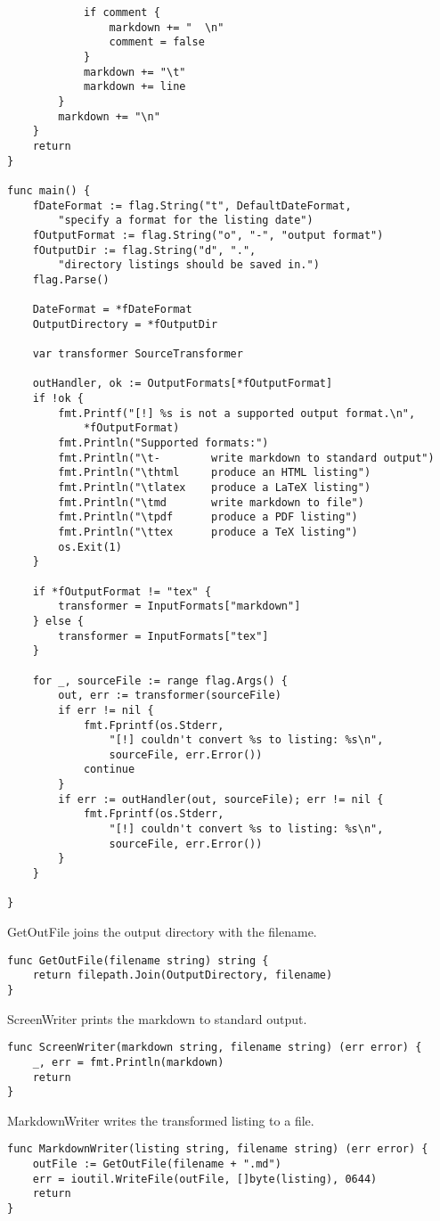 \documentclass[11pt]{article}
\begin{document}
\begin{verbatim}
			if comment {
				markdown += "  \n"
				comment = false
			}
			markdown += "\t"
			markdown += line
		}
		markdown += "\n"
	}
	return
}

func main() {
	fDateFormat := flag.String("t", DefaultDateFormat,
		"specify a format for the listing date")
	fOutputFormat := flag.String("o", "-", "output format")
	fOutputDir := flag.String("d", ".",
		"directory listings should be saved in.")
	flag.Parse()

	DateFormat = *fDateFormat
	OutputDirectory = *fOutputDir

	var transformer SourceTransformer

	outHandler, ok := OutputFormats[*fOutputFormat]
	if !ok {
		fmt.Printf("[!] %s is not a supported output format.\n",
			*fOutputFormat)
		fmt.Println("Supported formats:")
		fmt.Println("\t-        write markdown to standard output")
		fmt.Println("\thtml     produce an HTML listing")
		fmt.Println("\tlatex    produce a LaTeX listing")
		fmt.Println("\tmd       write markdown to file")
		fmt.Println("\tpdf      produce a PDF listing")
		fmt.Println("\ttex      produce a TeX listing")
		os.Exit(1)
	}

	if *fOutputFormat != "tex" {
		transformer = InputFormats["markdown"]
	} else {
		transformer = InputFormats["tex"]
	}

	for _, sourceFile := range flag.Args() {
		out, err := transformer(sourceFile)
		if err != nil {
			fmt.Fprintf(os.Stderr,
				"[!] couldn't convert %s to listing: %s\n",
				sourceFile, err.Error())
			continue
		}
		if err := outHandler(out, sourceFile); err != nil {
			fmt.Fprintf(os.Stderr,
				"[!] couldn't convert %s to listing: %s\n",
				sourceFile, err.Error())
		}
	}

}

\end{verbatim}

GetOutFile joins the output directory with the filename.


\begin{verbatim}
func GetOutFile(filename string) string {
	return filepath.Join(OutputDirectory, filename)
}

\end{verbatim}

ScreenWriter prints the markdown to standard output.


\begin{verbatim}
func ScreenWriter(markdown string, filename string) (err error) {
	_, err = fmt.Println(markdown)
	return
}

\end{verbatim}

MarkdownWriter writes the transformed listing to a file.


\begin{verbatim}
func MarkdownWriter(listing string, filename string) (err error) {
	outFile := GetOutFile(filename + ".md")
	err = ioutil.WriteFile(outFile, []byte(listing), 0644)
	return
}
\end{verbatim}
\end{document}
